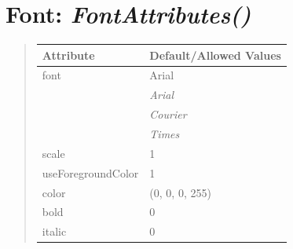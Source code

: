 \documentclass[letterpaper,10pt,english]{sphinxmanual}
\begin{document}
\section{\textbf{Font}: \emph{FontAttributes()}}
\label{attributes:font-fontattributes}
\begin{DUlineblock}{0em}
\item[] 
\end{DUlineblock}
\begin{quote}

\begin{tabulary}{\linewidth}{|L|L|}
\hline

\textbf{Attribute}
 & 
\textbf{Default/Allowed Values}
\\
\hline
font
 & 
Arial
\\
\hline & 
\emph{Arial}
\\
\hline & 
\emph{Courier}
\\
\hline & 
\emph{Times}
\\
\hline
scale
 & 
1
\\
\hline
useForegroundColor
 & 
1
\\
\hline
color
 & 
(0, 0, 0, 255)
\\
\hline
bold
 & 
0
\\
\hline
italic
 & 
0
\\
\hline\end{tabulary}

\end{quote}

\begin{DUlineblock}{0em}
\item[] 
\end{DUlineblock}

\begin{DUlineblock}{0em}
\item[] 
\end{DUlineblock}
\end{document}
